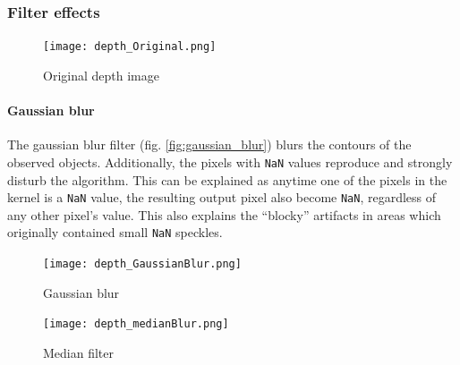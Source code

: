 \documentclass[DIV12,a4paper]{scrartcl}
\begin{document}

\subsubsection{Filter effects}
\label{sec:filter_effects}
\begin{figure}[h!tbp]
  \centering
  \texttt{[image: depth\_Original.png]}
  \caption{Original depth image}
  \label{fig:original_depth}
\end{figure}

\paragraph{Gaussian blur}
The gaussian blur filter (fig. \ref{fig:gaussian_blur}) blurs the contours of the observed objects. Additionally, the pixels with \texttt{NaN} values reproduce and strongly disturb the algorithm. This can be explained as anytime one of the pixels in the kernel is a \texttt{NaN} value, the resulting  output pixel also become \texttt{NaN}, regardless of any other pixel's value. This also explains the ``blocky'' artifacts in areas which originally contained small \texttt{NaN} speckles.
\begin{figure}[h!tbp]
  \centering
  \begin{minipage}{.5\textwidth}
    \centering
    \texttt{[image: depth\_GaussianBlur.png]}
    \caption{Gaussian blur}
    \label{fig:gaussian_blur}
  \end{minipage}%
  \begin{minipage}{.5\textwidth}
    \centering
    \texttt{[image: depth\_medianBlur.png]}
    \caption{Median filter}
    \label{fig:median_depth}
  \end{minipage}
\end{figure}
\end{document}
